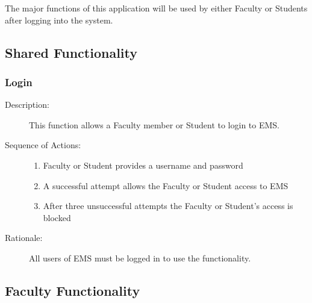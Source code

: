 
\label{sec:product_functions}


The major functions of this application will be used by either Faculty or Students
after logging into the system.

\subsection{Shared Functionality}
   \subsubsection{\large Login} 
   \begin{boxed} %
      \begin{description}
         \item[Description:\label{desc:login}]
      This function allows a Faculty member or Student to login to EMS.
      
         \item[Sequence of Actions:]\hspace{10cm}
      \begin{enumerate}
         \item Faculty or Student provides a username and password
         \item A successful attempt allows the Faculty or Student access to EMS
         \item After three unsuccessful attempts the Faculty or Student's access
            is blocked
      \end{enumerate}

         \item[Rationale:]
            All users of EMS must be logged in to use the functionality.
      \end{description}
   \end{boxed} %

\subsection{Faculty Functionality}

